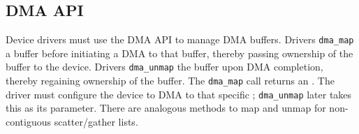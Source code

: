 \subsection{DMA API}
Device drivers must use the DMA API to manage DMA buffers. Drivers \texttt{dma\_map} a buffer before initiating a DMA to that buffer, thereby passing ownership of
the buffer to the device. Drivers \texttt{dma\_unmap} the buffer upon
DMA completion, thereby regaining ownership of the buffer.
The \texttt{dma\_map} call returns an \iova. The driver must configure the device to DMA to that specific \iova;
\texttt{dma\_unmap} later takes this \iova as its parameter. There are analogous methods to map and unmap for non-contiguous scatter/gather lists.